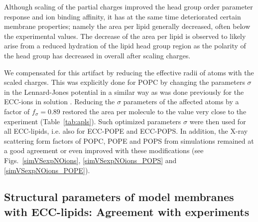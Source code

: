Although scaling of the partial charges improved 
the head group order parameter response and ion binding affinity,
it has at the same time deteriorated certain membrane properties; 
namely the area per lipid generally decreased, often below the experimental values. 
The decrease of the area per lipid is observed to likely arise from a reduced hydration of the lipid head group region
as the polarity of the head group has decreased in overall after scaling charges. 

We compensated for this artifact
by reducing the effective radii of atoms with the scaled charges.
This was explicitly done for POPC by changing the parameters $\sigma$ in the Lennard-Jones potential 
in a similar way as was done previously for the ECC-ions in solution \cite{kohagen14,kohagen16,Pluharova2014}.
Reducing the $\sigma$ parameters of the affected atoms by a factor of $f_\sigma = 0.89$
restored the area per molecule to the value very close to the experiment (Table~\ref{tab:apls}). 
Such optimized parameters $\sigma$ were then used for all ECC-lipids, i.e. also for ECC-POPE and ECC-POPS. 
In addition, the X-ray scattering form factors of POPC, POPE and POPS from simulations remained at a good agreement or even improved with these modifications 
(see Figs.~\ref{simVSexpNOions}, \ref{simVSexpNOions_POPS} and \ref{simVSexpNOions_POPE}). 








\subsection{Structural parameters of model membranes with ECC-lipids: Agreement with experiments} 
 
